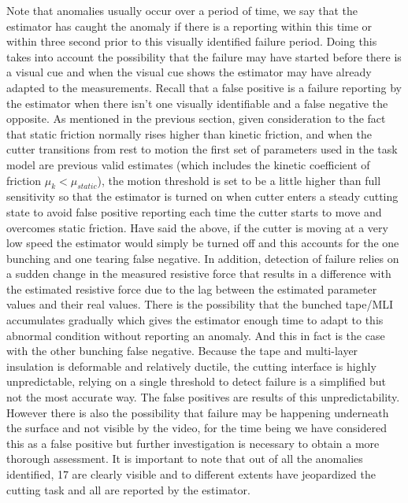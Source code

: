 \documentclass[letterpaper, 10 pt, conference]{ieeeconf}  %
\begin{document}
\noindent Note that anomalies usually occur over a period of time, we say that the estimator has caught the anomaly if there is a reporting within this time or within three second prior to this visually identified failure period. Doing this takes into account the possibility that the failure may have started before there is a visual cue and when the visual cue shows the estimator may have already adapted to the measurements.  
Recall that a false positive is a failure reporting by the estimator when there isn't one visually identifiable and a false negative the opposite. As mentioned in the previous section, given consideration to the fact that static friction normally rises higher than kinetic friction, and when the cutter transitions from rest to motion the first set of parameters used in the task model are previous valid estimates (which includes the kinetic coefficient of friction $\mu_k < \mu_{static}$), the motion threshold is set to be a little higher than full sensitivity so that the estimator is turned on when cutter enters a steady cutting state to avoid false positive reporting each time the cutter starts to move and overcomes static friction. Have said the above, if the cutter is moving at a very low speed the estimator would simply be turned off and this accounts for the one bunching and one tearing false negative. In addition, detection of failure relies on a sudden change in the measured resistive force that results in a difference with the estimated resistive force due to the lag between the estimated parameter values and their real values. There is the possibility that the bunched tape/MLI accumulates gradually which gives the estimator enough time to adapt to this abnormal condition without reporting an anomaly. And this in fact is the case with the other bunching false negative. Because the tape and multi-layer insulation is deformable and relatively ductile, the cutting interface is highly unpredictable, relying on a single threshold to detect failure is a simplified but not the most accurate way. The false positives are results of this unpredictability. However there is also the possibility that failure may be happening underneath the surface and not visible by the video, for the time being we have considered this as a false positive but further investigation is necessary to obtain a more thorough assessment. It is important to note that out of all the anomalies identified, 17 are clearly visible and to different extents have jeopardized the cutting task and all are reported by the estimator. 
\end{document}

